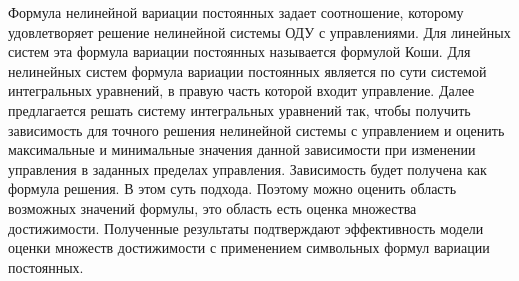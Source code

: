 Формула нелинейной вариации постоянных задает соотношение, которому удовлетворяет решение нелинейной системы ОДУ с управлениями. Для линейных систем эта формула вариации постоянных называется формулой Коши. Для нелинейных систем формула вариации постоянных является по сути системой интегральных уравнений, в правую часть которой входит управление. Далее предлагается решать систему интегральных уравнений так, чтобы получить зависимость для точного решения нелинейной системы с управлением и оценить максимальные и минимальные значения данной зависимости при изменении управления в заданных пределах управления. Зависимость будет получена как формула решения. В этом суть подхода. Поэтому можно оценить область возможных значений формулы, это область есть оценка множества достижимости.
Полученные результаты подтверждают эффективность модели оценки множеств достижимости с применением символьных формул вариации постоянных.




%

%

